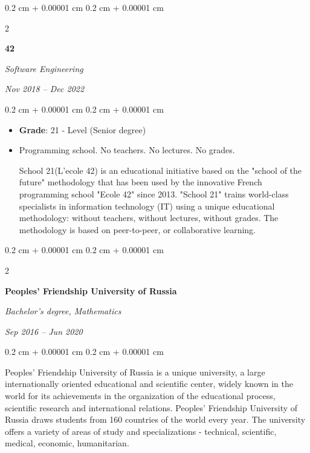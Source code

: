 \documentclass[10pt, letterpaper]{article}
\newenvironment{highlights}{
    \begin{itemize}[
        topsep=0.10 cm,
        parsep=0.10 cm,
        partopsep=0pt,
        itemsep=0pt,
        leftmargin=0.4 cm + 10pt
    ]
}{
    \end{itemize}
} %
\newenvironment{onecolentry}{
    \begin{adjustwidth}{
        0.2 cm + 0.00001 cm
    }{
        0.2 cm + 0.00001 cm
    }
}{
    \end{adjustwidth}
} %
\newenvironment{twocolentry}[2][]{
    \onecolentry
    \def\secondColumn{#2}
    \setcolumnwidth{\fill, 4.5 cm}
    \begin{paracol}{2}
}{
    \switchcolumn \raggedleft \secondColumn
    \end{paracol}
    \endonecolentry
} %
\begin{document}
        
        \begin{twocolentry}{
            
            
        \textit{Nov 2018 – Dec 2022}}
            \textbf{42}

            \textit{Software Engineering}
        \end{twocolentry}

        \vspace{0.10 cm}
        \begin{onecolentry}
            \begin{highlights}
                \item \textbf{Grade}: 21 - Level (Senior degree)
                \item Programming school. No teachers. No lectures. No grades. 

School 21(L'ecole 42) is an educational initiative based on the "school of the future" methodology that has been used by the innovative French programming school "Ecole 42" since 2013. "School 21" trains world-class specialists in information technology (IT) using a unique educational methodology: without teachers, without lectures, without grades. The methodology is based on peer-to-peer, or collaborative learning.

            \end{highlights}
        \end{onecolentry}

  
        \begin{twocolentry}{
            
            
        \textit{Sep 2016 – Jun 2020}}
            \textbf{Peoples' Friendship University of Russia}

            \textit{Bachelor's degree, Mathematics}
        \end{twocolentry}

        \vspace{0.10 cm}
        \begin{onecolentry}
            \begin{highlights}
                Peoples' Friendship University of Russia is a unique university, a large internationally oriented educational and scientific center, widely known in the world for its achievements in the organization of the educational process, scientific research and international relations. Peoples' Friendship University of Russia draws students from 160 countries of the world every year. The university offers a variety of areas of study and specializations - technical, scientific, medical, economic, humanitarian.

            \end{highlights}
        \end{onecolentry}
\end{document}
